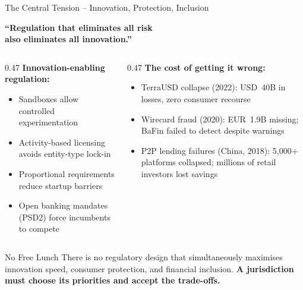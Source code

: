 \begin{frame}{The Central Tension -- Innovation, Protection, Inclusion}
  \begin{center}
    \Large
    \textcolor{mlteal}{\textbf{``Regulation that eliminates all risk\\
    also eliminates all innovation.''}}
  \end{center}
  \vspace{0.5em}
  \begin{columns}[T]
    \begin{column}{0.47\textwidth}
      \textcolor{mlgreen}{\textbf{Innovation-enabling regulation:}}
      \begin{itemize}
        \item Sandboxes allow controlled experimentation
        \item Activity-based licensing avoids entity-type lock-in
        \item Proportional requirements reduce startup barriers
        \item Open banking mandates (PSD2) force incumbents to compete
      \end{itemize}
    \end{column}
    \begin{column}{0.47\textwidth}
      \textcolor{mlred}{\textbf{The cost of getting it wrong:}}
      \begin{itemize}
        \item TerraUSD collapse (2022): USD~40B in losses, zero consumer
              recourse
        \item Wirecard fraud (2020): EUR~1.9B missing; BaFin failed to
              detect despite warnings
        \item P2P lending failures (China, 2018): 5,000+ platforms collapsed;
              millions of retail investors lost savings
      \end{itemize}
    \end{column}
  \end{columns}
  \vspace{0.5em}
  \begin{alertblock}{No Free Lunch}
    There is no regulatory design that simultaneously maximises innovation
    speed, consumer protection, and financial inclusion.
    \textcolor{mlred}{\textbf{A jurisdiction must choose its priorities and
    accept the trade-offs.}}
  \end{alertblock}
\end{frame}


